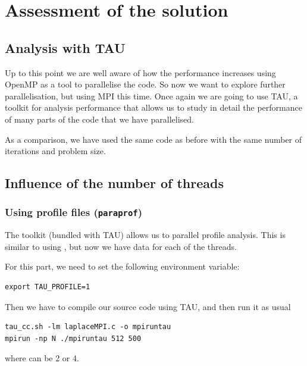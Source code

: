 \section{Assessment of the solution}\label{sec:assessment}

\subsection{Analysis with TAU}

Up to this point we are well aware of how the performance increases using OpenMP as a tool to parallelise the code. So now we want to explore further parallelisation, but using MPI this time. Once again we are going to use TAU, a toolkit for analysis performance that allows us to study in detail the performance of many parts of the code that we have parallelised.

As a comparison, we have used the same code as before with the same number of iterations and problem size.

\subsection{Influence of the number of threads}

\subsubsection{Using profile files (\texttt{paraprof})}

The toolkit  (bundled with TAU) allows us to parallel profile analysis. This is similar to using , but now we have data for each of the threads.

For this part, we need to set the following environment variable:
\begin{lstlisting}
export TAU_PROFILE=1
\end{lstlisting}

Then we have to compile our source code using TAU, and then run it as usual
\begin{lstlisting}
tau_cc.sh -lm laplaceMPI.c -o mpiruntau
mpirun -np N ./mpiruntau 512 500
\end{lstlisting}
where  can be 2 or 4.

